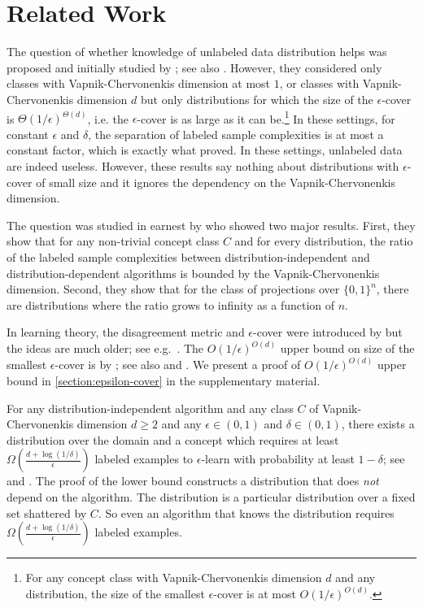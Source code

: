 \section{Related Work}
\label{section:related-work}

The question of whether knowledge of unlabeled data distribution helps was
proposed and initially studied by \citet{Ben-David-Lu-Pal-2008}; see also
\citet{Lu-2009}. However, they considered only classes with Vapnik-Chervonenkis
dimension at most $1$, or classes with Vapnik-Chervonenkis dimension $d$ but
only distributions for which the size of the $\epsilon$-cover is
$\Theta(1/\epsilon)^{\Theta(d)}$, i.e. the $\epsilon$-cover is as large as it
can be.\footnote{For any concept class with Vapnik-Chervonenkis dimension $d$
and any distribution, the size of the smallest $\epsilon$-cover is at most
$O(1/\epsilon)^{O(d)}$.} In these settings, for constant $\epsilon$ and $\delta$,
the separation of labeled sample complexities is at most a constant factor,
which is exactly what \citet{Ben-David-Lu-Pal-2008} proved. In these settings,
unlabeled data are indeed useless. However, these results say nothing about
distributions with $\epsilon$-cover of small size and it ignores the dependency
on the Vapnik-Chervonenkis dimension.

The question was studied in earnest by \citet{Darnstadt-Simon-Szorenyi-2013} who
showed two major results. First, they show that for any non-trivial concept
class $C$ and for every distribution, the ratio of the labeled sample
complexities between distribution-independent and distribution-dependent
algorithms is bounded by the Vapnik-Chervonenkis dimension. Second, they show
that for the class of projections over $\{0,1\}^n$, there are distributions
where the ratio grows to infinity as a function of $n$.

In learning theory, the disagreement metric and $\epsilon$-cover were introduced
by \citet{Benedek-Itai-1991} but the ideas are much older; see
e.g.~\citet{Dudley-1978, Dudley-1984}. The $O(1/\epsilon)^{O(d)}$ upper bound on
size of the smallest $\epsilon$-cover is by \citet[Lemma 7.13]{Dudley-1978}; see
also \citet[Chapter 4]{Devroye-Lugosi-2000} and \citet{Haussler-1995}. We
present a proof of $O(1/\epsilon)^{O(d)}$ upper bound in
\autoref{section:epsilon-cover} in the supplementary material.

For any distribution-independent algorithm and any class $C$ of
Vapnik-Chervonenkis dimension $d \ge 2$ and any $\epsilon \in (0,1)$ and $\delta
\in (0,1)$, there exists a distribution over the domain and a concept which
requires at least $\Omega \left(\frac{d + \log(1/\delta)}{\epsilon}\right)$
labeled examples to $\epsilon$-learn with probability at least $1 - \delta$;
see~\citet[Theorem 5.3]{Anthony-Bartlett-1999} and
\citet{Blumer-Ehrenfeucht-Haussler-Warmuth-1989,
Ehrenfeucht-Haussler-Kearns-Valiant-1989}. The proof of the lower bound
constructs a distribution that does \emph{not} depend on the algorithm. The
distribution is a particular distribution over a fixed set shattered by $C$. So
even an algorithm that knows the distribution requires $\Omega \left(\frac{d +
\log(1/\delta)}{\epsilon}\right)$ labeled examples.
